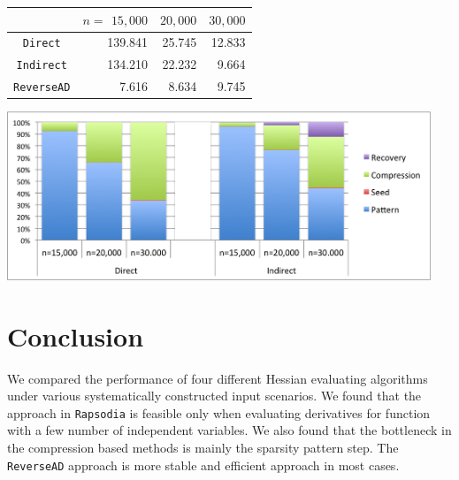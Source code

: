 \documentclass[11pt, a4paper, english]{article}
\begin{document}
\begin{minipage}{\textwidth}
  \begin{minipage}[b]{0.45\textwidth}
    \centering
\begin{tabular}{ | c | r | r | r |}
\hline
& $n=$ $15,000$ & $20,000$ & $30,000$\\
\hline
{\tt Direct} & 139.841 & 25.745 & 12.833\\
{\tt Indirect} & 134.210 & 22.232 & 9.664 \\
{\tt ReverseAD} & 7.616 & 8.634 & 9.745\\
\hline 
\end{tabular}
\vspace{0.3cm}
\end{minipage}
\begin{minipage}[b]{0.06\textwidth}
\phantom{b}
\end{minipage}
  \begin{minipage}[b]{0.45\textwidth}
    \centering
        \includegraphics[width=0.95\textwidth]{figures/pd}
  \end{minipage}
  \hfill
\end{minipage}

\section*{Conclusion}
We compared the performance of four different Hessian evaluating algorithms under various systematically constructed input scenarios. We found that the approach in {\tt Rapsodia} is feasible only when evaluating derivatives for function with a few number of independent variables. We also found that the bottleneck in the compression based methods is mainly the sparsity pattern step. The {\tt ReverseAD} approach is more stable and efficient approach in most cases. 




\end{document}
